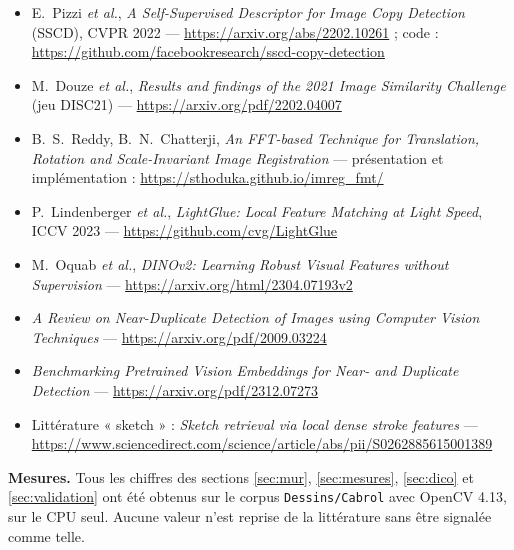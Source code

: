 \documentclass[11pt,a4paper]{article}
\begin{document}
\small\raggedright
\begin{itemize}[leftmargin=*,itemsep=3pt]
  \item E.~Pizzi \emph{et al.}, \emph{A Self-Supervised Descriptor for Image
  Copy Detection} (SSCD), CVPR 2022 —
  \url{https://arxiv.org/abs/2202.10261} ;
  code : \url{https://github.com/facebookresearch/sscd-copy-detection}
  \item M.~Douze \emph{et al.}, \emph{Results and findings of the 2021 Image
  Similarity Challenge} (jeu DISC21) —
  \url{https://arxiv.org/pdf/2202.04007}
  \item B.~S.~Reddy, B.~N.~Chatterji, \emph{An FFT-based Technique for
  Translation, Rotation and Scale-Invariant Image Registration} —
  présentation et implémentation :
  \url{https://sthoduka.github.io/imreg_fmt/}
  \item P.~Lindenberger \emph{et al.}, \emph{LightGlue: Local Feature Matching
  at Light Speed}, ICCV 2023 —
  \url{https://github.com/cvg/LightGlue}
  \item M.~Oquab \emph{et al.}, \emph{DINOv2: Learning Robust Visual Features
  without Supervision} —
  \url{https://arxiv.org/html/2304.07193v2}
  \item \emph{A Review on Near-Duplicate Detection of Images using Computer
  Vision Techniques} — \url{https://arxiv.org/pdf/2009.03224}
  \item \emph{Benchmarking Pretrained Vision Embeddings for Near- and Duplicate
  Detection} — \url{https://arxiv.org/pdf/2312.07273}
  \item Littérature « sketch » : \emph{Sketch retrieval via local dense stroke
  features} —
  \url{https://www.sciencedirect.com/science/article/abs/pii/S0262885615001389}
\end{itemize}

\medskip
\textbf{Mesures.} Tous les chiffres des sections \ref{sec:mur},
\ref{sec:mesures}, \ref{sec:dico} et \ref{sec:validation} ont été obtenus sur le
corpus \texttt{Dessins/Cabrol} avec OpenCV 4.13, sur le CPU seul. Aucune valeur
n'est reprise de la littérature sans être signalée comme telle.
\end{document}
